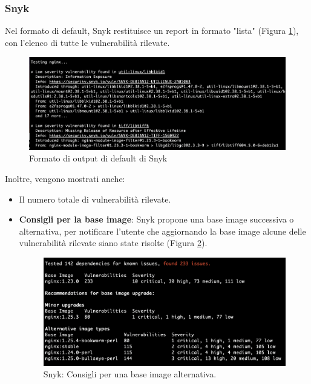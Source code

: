 \subsubsection{Snyk}
Nel formato di default, Snyk restituisce un report in formato "lista" (Figura \ref{fig:snyk_output_fmt}), con l'elenco di tutte le vulnerabilità rilevate.
\begin{figure}[H]
   \centering
   \includegraphics[width=1\textwidth]{immagini/capitolo2/snyk_output_fmt.png}
   \caption{Formato di output di default di Snyk}
   \label{fig:snyk_output_fmt}
\end{figure}

Inoltre, vengono mostrati anche:
\begin{itemize}
   \item Il numero totale di vulnerabilità rilevate.
   \item \textbf{Consigli per la base image}: Snyk propone una base image successiva o alternativa, per notificare l'utente che aggiornando la base image alcune delle vulnerabilità rilevate siano state risolte (Figura \ref{fig:snyk_altn_imgs}).
         \begin{figure}[H]
            \centering
            \includegraphics[width=1\textwidth]{immagini/capitolo2/snyk_altn_images.png}
            \caption{Snyk: Consigli per una base image alternativa.}
            \label{fig:snyk_altn_imgs}
         \end{figure}
\end{itemize}

